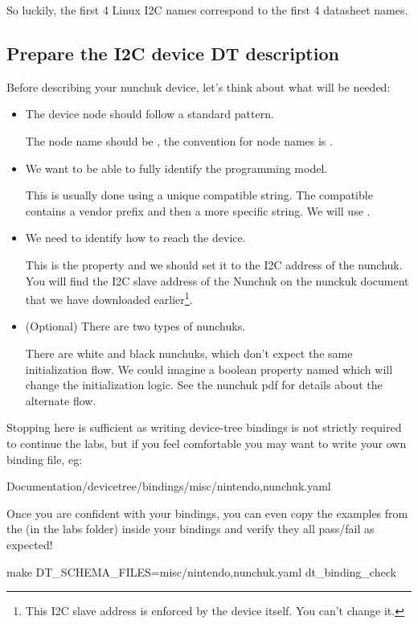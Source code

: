 So luckily, the first 4 Linux I2C names correspond to the first 4 datasheet
names.

\subsection{Prepare the I2C device DT description}

Before describing your nunchuk device, let's think about what will be
needed:
\begin{itemize}
\item The device node should follow a standard pattern.

  The node name should be , the convention for node
  names is .

\item We want to be able to fully identify the programming model.

  This is usually done using a unique compatible string. The compatible
  contains a vendor prefix and then a more specific string. We will use
  .

\item We need to identify how to reach the device.

  This is the  property and we should set it to the I2C
  address of the nunchuk. You will find the I2C slave address of the
  Nunchuk on the nunckuk document that we have downloaded
  earlier\footnote{This I2C slave address is enforced by the device
    itself. You can't change it.}.

\item (Optional) There are two types of nunchuks.

  There are white and black nunchuks, which don't expect the same
  initialization flow. We could imagine a boolean property named
   which will change the initialization
  logic. See the nunchuk pdf for details about the alternate flow.

\end{itemize}

Stopping here is sufficient as writing device-tree bindings is not
strictly required to continue the labs, but if you feel comfortable
you may want to write your own binding file, eg:
\begin{bashinput}
Documentation/devicetree/bindings/misc/nintendo,nunchuk.yaml
\end{bashinput}
Once you are confident with your bindings, you can even copy the
examples from the  (in the
 labs folder) inside your bindings and verify they all
pass/fail as expected!
\begin{bashinput}
make DT_SCHEMA_FILES=misc/nintendo,nunchuk.yaml dt_binding_check
\end{bashinput}

